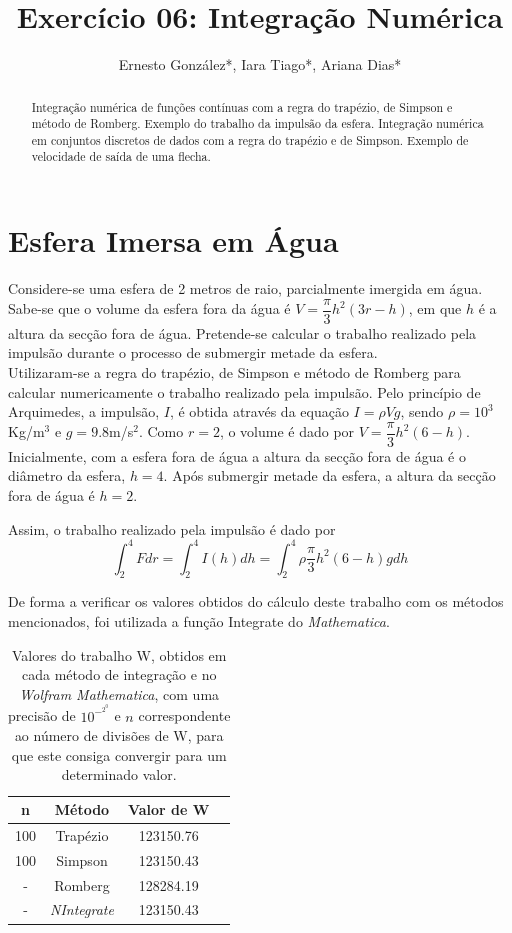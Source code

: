 \documentclass[aps,pre,twocolumn,showpacs,amsmath,amssymb]{revtex4-1}
\begin{document}
\title{Exercício 06: Integração Numérica}

\author{Ernesto González*, Iara Tiago*, Ariana Dias*}

\begin{abstract}
 Integração numérica de funções contínuas com a regra do trapézio, de Simpson e método de Romberg. Exemplo do trabalho da impulsão da esfera. Integração numérica em conjuntos discretos de dados com a regra do trapézio e de Simpson. Exemplo de velocidade de saída de uma flecha.
\end{abstract}

\maketitle

\section{Esfera Imersa em Água}
Considere-se uma esfera de 2 metros de raio, parcialmente imergida em água. Sabe-se que o volume da esfera fora da água é $V=\dfrac{\pi}{3}h^2(3r-h)$, em que $h$ é a altura da secção fora de água. Pretende-se calcular o trabalho realizado pela impulsão durante o processo de submergir metade da esfera.\\
Utilizaram-se a regra do trapézio, de Simpson e método de Romberg para calcular numericamente o trabalho realizado pela impulsão.
Pelo princípio de Arquimedes, a impulsão, $I$, é obtida através da equação $I=\rho Vg$, sendo
$\rho=10^3$Kg/m$^3$ e $g=9.8$m/s$^2$. Como $r=2$, o volume é dado por $V=\dfrac{\pi}{3}h^2(6-h)$. Inicialmente, com a esfera fora de água a altura da secção fora de água é o diâmetro da esfera, $h=4$. Após submergir metade da esfera, a altura da secção fora de água é $h=2$.

Assim, o trabalho realizado pela impulsão é dado por
\begin{equation}
    \int_2^4 Fdr=\int_2^4 I(h)dh=\int_2^4 \rho \dfrac{\pi}{3}h^2(6-h)g dh
\end{equation}

De forma a verificar os valores obtidos do cálculo deste trabalho com os métodos mencionados, foi utilizada a função Integrate do \textit{Mathematica}.

\begin{table}[hbt!]
\centering
\caption{Valores do trabalho W, obtidos em cada método de integração e no \textit{Wolfram Mathematica}, com uma precisão de $10^-^2^0$ e $n$ correspondente ao número de divisões de W, para que este consiga convergir para um determinado valor.}
\begin{tabular}{|c|c|c|c|}
    \hline
n & Método & Valor de W       \\ \hline
100 & Trapézio & 123150.76  \\ \hline
100 & Simpson & 123150.43  \\ \hline
- & Romberg & 128284.19  \\ \hline
- & \textit{NIntegrate} & 123150.43  \\ \hline
\end{tabular}
\end{table}
\end{document}
